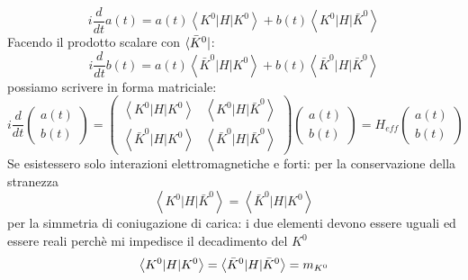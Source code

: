 \begin{equation*}
    i \frac{d}{d t} a(t) =a(t)\left\langle K^0|H| K^0\right\rangle+b(t)\left\langle K^0|H| \bar{K}^0\right\rangle
\end{equation*}
Facendo il prodotto scalare con $\langle \Bar{K}^0|$:
\begin{equation*}
    i \frac{d}{d t} b(t) =a(t)\left\langle\bar{K}^0|H| K^0\right\rangle+b(t)\left\langle\bar{K}^0|H| \bar{K}^0\right\rangle 
\end{equation*}
possiamo scrivere in forma matriciale:
\begin{equation*}
    i \frac{d}{d t}\left(\begin{array}{c} a(t) \\ b(t) \end{array}\right)=\left(\begin{array}{cc} \left\langle K^0|H| K^0\right\rangle & \left\langle K^0|H| \bar{K}^0\right\rangle \\ \left\langle\bar{K}^0|H| K^0\right\rangle & \left\langle\bar{K}^0|H| \bar{K}^0\right\rangle \end{array}\right)\left(\begin{array}{c} a(t) \\ b(t) \end{array}\right)=H_{e f f}\left(\begin{array}{c} a(t) \\ b(t) \end{array}\right)
\end{equation*}
Se esistessero solo interazioni elettromagnetiche e forti: per la conservazione della stranezza
\begin{equation*}
    \left\langle K^0|H| \bar{K}^0\right\rangle=\left\langle \bar{K}^0|H| K^0\right\rangle
\end{equation*}
per la simmetria di coniugazione di carica: i due elementi devono essere uguali ed essere reali perchè mi impedisce il decadimento del $K^0$
\begin{equation*}
    \left\langle K^0|H| K^0\right\rangle=\left\langle \Bar{K}^0|H| \Bar{K}^0\right\rangle=m_{K^0}
\end{equation*}
